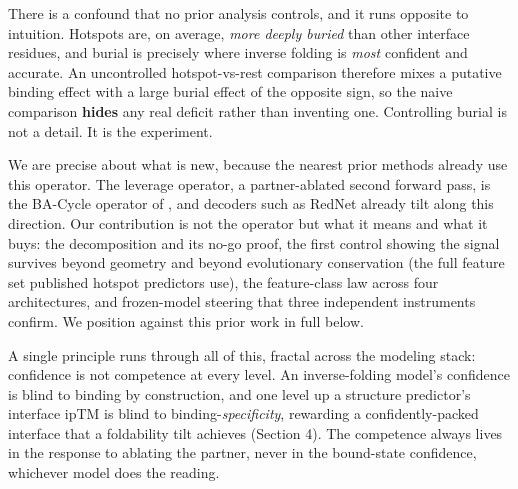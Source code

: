 \documentclass{article} %
\begin{document}
There is a confound that no prior analysis controls, and it runs opposite to intuition. Hotspots are, on average,
\emph{more deeply buried} than other interface residues, and burial is precisely where inverse folding is
\emph{most} confident and accurate. An uncontrolled hotspot-vs-rest comparison therefore mixes a putative binding
effect with a large burial effect of the opposite sign, so the naive comparison \textbf{hides} any real deficit
rather than inventing one. Controlling burial is not a detail. It is the experiment.

We are precise about what is new, because the nearest prior methods already use this operator. The leverage
operator, a partner-ablated second forward pass, is the BA-Cycle operator of \citet{jiao2024bacycle}, and decoders
such as RedNet \citep{rednet2026} already tilt along this direction. Our contribution is not the operator but what
it means and what it buys: the decomposition and its no-go proof, the first control showing the signal survives
beyond geometry and beyond evolutionary conservation (the full feature set published hotspot predictors use), the
feature-class law across four architectures, and frozen-model steering that three independent instruments confirm.
We position against this prior work in full below.

A single principle runs through all of this, fractal across the modeling stack: confidence is not competence at
every level. An inverse-folding model's confidence is blind to binding by construction, and one level up a
structure predictor's interface ipTM is blind to binding-\emph{specificity}, rewarding a confidently-packed
interface that a foldability tilt achieves (Section 4). The competence always lives in the response to ablating the
partner, never in the bound-state confidence, whichever model does the reading.
\end{document}
